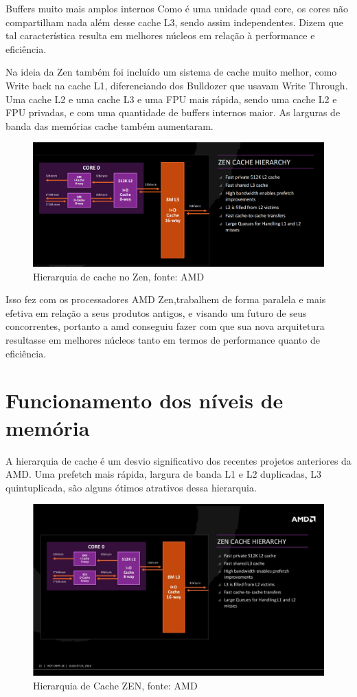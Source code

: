 \documentclass[12pt]{article}
\begin{document}
Buffers muito mais amplos internos
Como é uma unidade quad core, os cores não compartilham nada além desse cache L3, sendo assim independentes. Dizem que tal característica resulta em melhores núcleos em relação à performance e eficiência.

Na ideia da Zen também foi incluído um sistema de cache muito melhor, como Write back na cache L1, diferenciando dos Bulldozer que usavam Write Through. Uma cache L2 e uma cache L3 e uma FPU mais rápida, sendo uma cache L2 e FPU privadas, e com uma quantidade de buffers internos maior. As larguras de banda das memórias cache também aumentaram.

\begin{figure}[H]
\centering
\includegraphics[width=120mm,scale=0.8]{ZenCache.png}
\caption{Hierarquia de cache no Zen, fonte: AMD}
\label{fig:amd}
\end{figure}

Isso fez com os processadores AMD Zen,trabalhem de forma paralela e mais efetiva em relação a seus produtos antigos, e visando um futuro de seus concorrentes, portanto a amd conseguiu fazer com que sua nova arquitetura resultasse em melhores núcleos tanto em termos de performance quanto de eficiência.

\newpage

\section{Funcionamento dos níveis de memória}

A hierarquia de cache é um desvio significativo dos recentes projetos anteriores da AMD. Uma prefetch mais rápida, largura de banda L1 e L2 duplicadas, L3 quintuplicada, são alguns ótimos atrativos dessa hierarquia.


\begin{figure}[H]
\centering
\includegraphics[width=115mm,scale=0.8]{Cache.png}
\caption{Hierarquia de Cache ZEN, fonte: AMD}
\label{fig:cache}
\end{figure}
\end{document}

